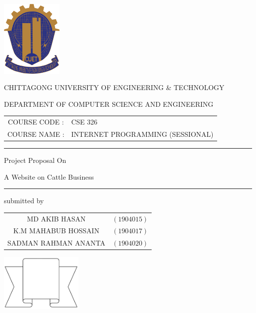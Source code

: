 \documentclass[a4paper,12pt]{report}
\begin{document}
\begin{titlepage}

	\centering

	\includegraphics[width=3cm, keepaspectratio]{cuet.png} \par \vspace{0.5cm}
	\begin{Large}
		CHITTAGONG UNIVERSITY OF ENGINEERING \& TECHNOLOGY
	\end{Large}
	\par
	\vspace{.5cm}
	{DEPARTMENT OF COMPUTER SCIENCE AND ENGINEERING}
	\vspace{3cm}

	\begin{tabular}{cl}
		COURSE CODE : & CSE 326                          \\
		COURSE NAME : & INTERNET PROGRAMMING (SESSIONAL)
	\end{tabular}
	\vspace{0.5cm}

	\raisebox{-\baselineskip}{\rule{\textwidth}{1px}}
	\rule{\textwidth}{1px}

	{\Large{{Project Proposal On}}}\par \vspace{0.5cm}
	\huge{{A Website on Cattle Business}}
	\rule{\textwidth}{2px}

	\vspace{1cm}
	\normalsize

	\parbox[l]{9cm}{
		\begin{center}
			submitted by
		\end{center}

		\begin{tabular}{cl}
			MD AKIB HASAN        & $(1904015)$ \\
			K.M MAHABUB HOSSAIN  & $(1904017)$ \\
			SADMAN RAHMAN ANANTA & $(1904020)$ \\
		\end{tabular}
	}
	\parbox[r]{7cm}{
		\vspace{1cm}
		\begin{center}
			\includegraphics[width=4cm, keepaspectratio]{remarks.png}
		\end{center}
	}


\end{titlepage}
\end{document}
